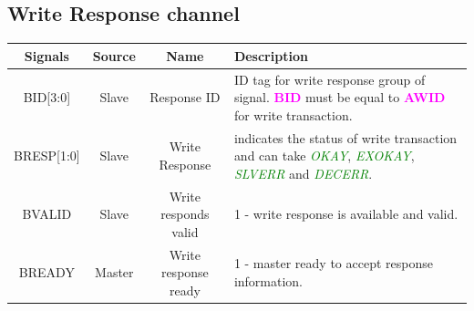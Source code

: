 \documentclass{article}
\newcommand{\AXISignals}[1]{\textbf{\textcolor{magenta}{#1}}}
\begin{document}
\subsection{Write Response channel}
\begin{table}[H]
    \begin{center}
        \begin{tabular}{c|c|c|p{9.5cm}}
            \textbf{Signals} & \textbf{Source} & \textbf{Name} & \textbf{Description}\\
            \hline
            BID[3:0] & Slave & Response ID & ID tag for write response group of signal. \AXISignals{BID} must be equal to \AXISignals{AWID} for write transaction.\\
            BRESP[1:0] & Slave & Write Response & indicates the status of write transaction and can take \emph{\textcolor{green}{OKAY}}, \emph{\textcolor{green}{EXOKAY}}, \emph{\textcolor{green}{SLVERR}} and \emph{\textcolor{green}{DECERR}}.\\
            BVALID & Slave & Write responds valid & 1 - write response is available and valid.\\
            BREADY & Master & Write response ready & 1 - master ready to accept response information.\\
        \end{tabular}
    \end{center}
\end{table}
\end{document}
